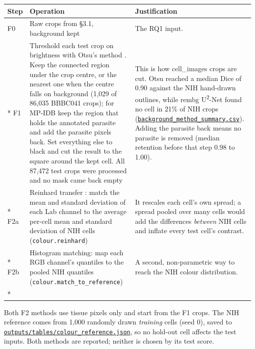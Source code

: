 \documentclass[11pt,a4paper]{article}
\begin{document}
{\small
\begin{longtable}{@{}>{\raggedright\arraybackslash\hspace{0pt}}p{25.5pt}>{\raggedright\arraybackslash\hspace{0pt}}p{160.2pt}>{\raggedright\arraybackslash\hspace{0pt}}p{138.3pt}@{}}
\toprule
Step & Operation & Justification \\
\midrule
\endhead
\bottomrule
\endfoot
\bottomrule
\endlastfoot
F0 & Raw crops from \S{}3.1, background kept & The RQ1 input. \\*
F1 & Threshold each test crop on brightness with Otsu's method \citep{otsu1979}. Keep the connected region under the crop centre, or the nearest one when the centre falls on background (1,029 of 86,035 BBBC041 crops); for MP-IDB keep the region that holds the annotated parasite and add the parasite pixels back. Set everything else to black and cut the result to the square around the kept cell. All 87,472 test crops were processed and no mask came back empty & This is how cell\_\allowbreak{}images crops are cut. Otsu reached a median Dice of 0.90 against the NIH hand-drawn outlines, while rembg U\textsuperscript{2}-Net found no cell in 21\% of NIH crops (\href{https://github.com/noahtjonsk/malaria-cross-dataset/blob/main/outputs/tables/background_method_summary.csv}{\texttt{background\_\allowbreak{}method\_\allowbreak{}summary.\allowbreak{}csv}}). Adding the parasite back means no parasite is removed (median retention before that step 0.98 to 1.00). \\*
F2a & Reinhard transfer \citep{reinhard2001}: match the mean and standard deviation of each Lab channel to the average per-cell mean and standard deviation of NIH cells (\texttt{colour.\allowbreak{}reinhard}) & It rescales each cell's own spread; a spread pooled over many cells would add the differences \emph{between} NIH cells and inflate every test cell's contrast. \\*
F2b & Histogram matching: map each RGB channel's quantiles to the pooled NIH quantiles (\texttt{colour.\allowbreak{}match\_\allowbreak{}to\_\allowbreak{}reference}) & A second, non-parametric way to reach the NIH colour distribution. \\*
\end{longtable}}
\addtocounter{table}{-1}

Both F2 methods use tissue pixels only and start from the F1 crops. The NIH reference comes from 1,000 randomly drawn \emph{training} cells (seed 0), saved to \href{https://github.com/noahtjonsk/malaria-cross-dataset/blob/main/outputs/tables/colour_reference.json}{\texttt{outputs/\allowbreak{}tables/\allowbreak{}colour\_\allowbreak{}reference.\allowbreak{}json}}, so no hold-out cell affects the test inputs. Both methods are reported; neither is chosen by its test score.
\end{document}
